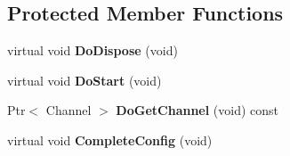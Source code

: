 \subsection*{\-Protected \-Member \-Functions}
\begin{DoxyCompactItemize}
\item 
\hypertarget{classns3_1_1PLC__NetDevice_a611509764bf53c3c8806b9b1a7bc5aa2}{virtual void {\bfseries \-Do\-Dispose} (void)}\label{classns3_1_1PLC__NetDevice_a611509764bf53c3c8806b9b1a7bc5aa2}

\item 
\hypertarget{classns3_1_1PLC__NetDevice_a5960c3c3752998d282c9d124ac19ace1}{virtual void {\bfseries \-Do\-Start} (void)}\label{classns3_1_1PLC__NetDevice_a5960c3c3752998d282c9d124ac19ace1}

\item 
\hypertarget{classns3_1_1PLC__NetDevice_a61bfbf6553a988bcf1e6eb65aed6d7ca}{\-Ptr$<$ \-Channel $>$ {\bfseries \-Do\-Get\-Channel} (void) const }\label{classns3_1_1PLC__NetDevice_a61bfbf6553a988bcf1e6eb65aed6d7ca}

\item 
\hypertarget{classns3_1_1PLC__NetDevice_a84e2c58327438a3a87650c908fb43188}{virtual void {\bfseries \-Complete\-Config} (void)}\label{classns3_1_1PLC__NetDevice_a84e2c58327438a3a87650c908fb43188}

\end{DoxyCompactItemize}
